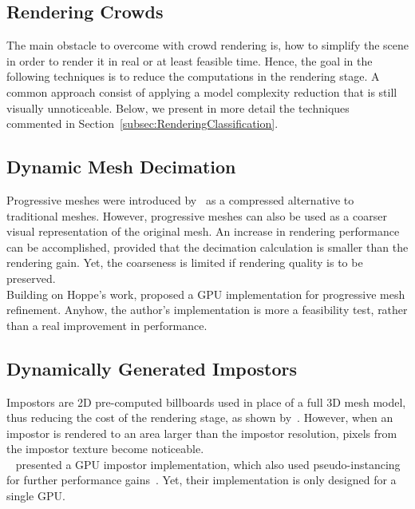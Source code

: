 \documentclass[6pt]{article} %
\begin{document}
\begin{multicols}{2}
\section{Rendering Crowds}

The main obstacle to overcome with crowd rendering is, how to simplify the scene in order to render it in real or at least feasible time.
Hence, the goal in the following techniques is to reduce the computations in the rendering stage.
A common approach consist of applying a model complexity reduction that is still visually unnoticeable.
Below, we present in more detail the techniques commented in Section~\ref{subsec:RenderingClassification}.

\subsection{Dynamic Mesh Decimation}

Progressive meshes were introduced by~\cite{Hoppe1996} as a compressed alternative to traditional meshes.
However, progressive meshes can also be used as a coarser visual representation of the original mesh.
An increase in rendering performance can be accomplished, provided that the decimation calculation is smaller than the rendering gain.
Yet, the coarseness is limited if rendering quality is to be preserved.\\

Building on Hoppe's work, \cite{Hu2009} proposed a GPU implementation for progressive mesh refinement.
Anyhow, the author's implementation is more a feasibility test, rather than a real improvement in performance.

\subsection{Dynamically Generated Impostors}
\label{subsec:DimGenImpostors}

Impostors are 2D pre-computed billboards used in place of a full 3D mesh model, thus reducing the cost of the rendering stage, as shown by~\cite{Aubel2000}.
However, when an impostor is rendered to an area larger than the impostor resolution, pixels from the impostor texture become noticeable.\\

~\cite{Millan2006} presented a GPU impostor implementation, which also used pseudo-instancing for further performance gains~\cite{zelsnack2004glsl}.
Yet, their implementation is only designed for a single GPU.\\


\end{multicols}
\end{document}

